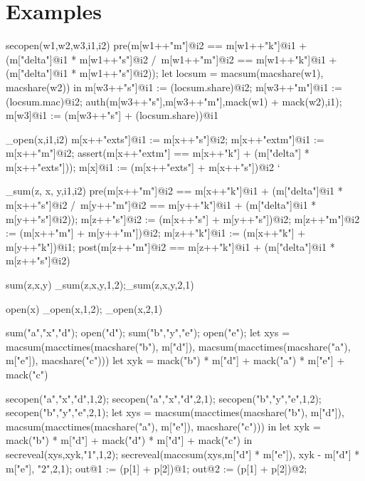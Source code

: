 \section{Examples}



\begin{verbatimtab}
  secopen(w1,w2,w3,i1,i2) {
      pre(m[w1++"m"]@i2 == m[w1++"k"]@i1 + (m["delta"]@i1 * m[w1++"s"]@i2 /\
          m[w1++"m"]@i2 == m[w1++"k"]@i1 + (m["delta"]@i1 * m[w1++"s"]@i2));
      let locsum =  macsum(macshare(w1), macshare(w2)) in
      m[w3++"s"]@i1 := (locsum.share)@i2;
      m[w3++"m"]@i1 := (locsum.mac)@i2;
      auth(m[w3++"s"],m[w3++"m"],mack(w1) + mack(w2),i1);
      m[w3]@i1 := (m[w3++"s"] + (locsum.share))@i1
  }

  
  _open(x,i1,i2){
    m[x++"exts"]@i1 := m[x++"s"]@i2;
    m[x++"extm"]@i1 := m[x++"m"]@i2;
    assert(m[x++"extm"] == m[x++"k"] + (m["delta"] * m[x++"exts"]));
    m[x]@i1 := (m[x++"exts"] + m[x++"s"])@i2
  }`
  
  _sum(z, x, y,i1,i2) {
      pre(m[x++"m"]@i2 == m[x++"k"]@i1 + (m["delta"]@i1 * m[x++"s"]@i2 /\
          m[y++"m"]@i2 == m[y++"k"]@i1 + (m["delta"]@i1 * m[y++"s"]@i2));
      m[z++"s"]@i2 := (m[x++"s"] + m[y++"s"])@i2;
      m[z++"m"]@i2 := (m[x++"m"] + m[y++"m"])@i2;
      m[z++"k"]@i1 := (m[x++"k"] + m[y++"k"])@i1;
      post(m[z++"m"]@i2 == m[z++"k"]@i1 + (m["delta"]@i1 * m[z++"s"]@i2)
  }

  sum(z,x,y) { _sum(z,x,y,1,2);_sum(z,x,y,2,1) }

  open(x) { _open(x,1,2); _open(x,2,1) } 


  sum("a","x","d");
  open("d");
  sum("b","y","e");
  open("e");
  let xys =
      macsum(macctimes(macshare("b"), m["d"]),
             macsum(macctimes(macshare("a"), m["e"]),
                    macshare("c")))
  let xyk = mack("b") * m["d"] + mack("a") * m["e"] + mack("c")
                    
  secopen("a","x","d",1,2);
    secopen("a","x","d",2,1);
    secopen("b","y","e",1,2);
    secopen("b","y","e",2,1);
    let xys =
      macsum(macctimes(macshare("b"), m["d"]),
             macsum(macctimes(macshare("a"), m["e"]),
                    macshare("c")))
    in
    let xyk = mack("b") * m["d"] + mack("d") * m["d"] + mack("c")               
    in
    secreveal(xys,xyk,"1",1,2);
    secreveal(maccsum(xys,m["d"] * m["e"]),
              xyk - m["d"] * m["e"],
              "2",2,1);
    out@1 := (p[1] + p[2])@1;
    out@2 := (p[1] + p[2])@2;
\end{verbatimtab}


